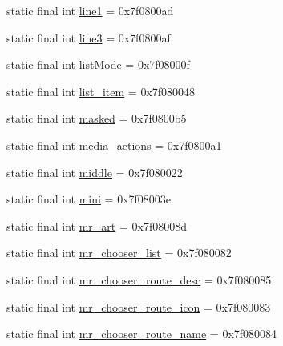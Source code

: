 \begin{CompactItemize}
\item 
static final int \hyperlink{classandroid_1_1support_1_1graphics_1_1drawable_1_1animated_1_1_r_1_1id_52674ffa9cd6d8b6f45b4c6fa65c80b4}{line1} = 0x7f0800ad
\item 
static final int \hyperlink{classandroid_1_1support_1_1graphics_1_1drawable_1_1animated_1_1_r_1_1id_a30b61475ac8aa162c68152f8814f9f1}{line3} = 0x7f0800af
\item 
static final int \hyperlink{classandroid_1_1support_1_1graphics_1_1drawable_1_1animated_1_1_r_1_1id_5005d7c9dc4323dba528897150df4290}{listMode} = 0x7f08000f
\item 
static final int \hyperlink{classandroid_1_1support_1_1graphics_1_1drawable_1_1animated_1_1_r_1_1id_68e4b72df2a873a475c2198587325da4}{list\_\-item} = 0x7f080048
\item 
static final int \hyperlink{classandroid_1_1support_1_1graphics_1_1drawable_1_1animated_1_1_r_1_1id_1d37b4a0d43991b2af982571370a8ec7}{masked} = 0x7f0800b5
\item 
static final int \hyperlink{classandroid_1_1support_1_1graphics_1_1drawable_1_1animated_1_1_r_1_1id_2647ef9ca644063479926e67beee32d4}{media\_\-actions} = 0x7f0800a1
\item 
static final int \hyperlink{classandroid_1_1support_1_1graphics_1_1drawable_1_1animated_1_1_r_1_1id_c730a1bd8b28e7642207e97380dc5093}{middle} = 0x7f080022
\item 
static final int \hyperlink{classandroid_1_1support_1_1graphics_1_1drawable_1_1animated_1_1_r_1_1id_4c72e0909fcdb68440d0fcc583c6a9e8}{mini} = 0x7f08003e
\item 
static final int \hyperlink{classandroid_1_1support_1_1graphics_1_1drawable_1_1animated_1_1_r_1_1id_101888d41e8b4bd2b8030679826e0785}{mr\_\-art} = 0x7f08008d
\item 
static final int \hyperlink{classandroid_1_1support_1_1graphics_1_1drawable_1_1animated_1_1_r_1_1id_a6bad4f6df285e2807bb836f7fe02aaa}{mr\_\-chooser\_\-list} = 0x7f080082
\item 
static final int \hyperlink{classandroid_1_1support_1_1graphics_1_1drawable_1_1animated_1_1_r_1_1id_a27a45c75cc2a68b5b3ba69aecf7da8e}{mr\_\-chooser\_\-route\_\-desc} = 0x7f080085
\item 
static final int \hyperlink{classandroid_1_1support_1_1graphics_1_1drawable_1_1animated_1_1_r_1_1id_12e471e59109daee2af712a5702bca21}{mr\_\-chooser\_\-route\_\-icon} = 0x7f080083
\item 
static final int \hyperlink{classandroid_1_1support_1_1graphics_1_1drawable_1_1animated_1_1_r_1_1id_ffd52b30e9b68a4999177a2127ca32e6}{mr\_\-chooser\_\-route\_\-name} = 0x7f080084

\end{CompactItemize}
